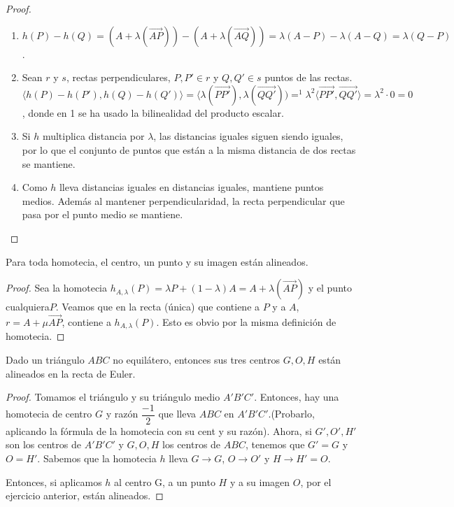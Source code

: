 \begin{proof}\hfill
\begin{enumerate}
	\item $h(P)-h(Q)=(A+\lambda(\vec{AP})) -(A+\lambda(\vec{AQ})) = \lambda(A-P) - \lambda(A-Q) = \lambda (Q-P)$.
	\item  Sean $r$ y $ s$, rectas perpendiculares, $P,P' \in r$ y $Q,Q'\in s$ puntos de las rectas. $\langle h(P) - h(P'),h(Q) - h(Q')\rangle  =  \langle \lambda (\vec{PP'}), \lambda(\vec {QQ'}))=^1 \lambda^2 \langle \vec{PP'},\vec{QQ'}\rangle  = \lambda^2 \cdot 0 = 0 $, donde en 1 se ha usado la bilinealidad del producto escalar.
	\item Si $h$ multiplica distancia por $\lambda$, las distancias iguales siguen siendo iguales, por lo que el conjunto de puntos que están a la misma distancia de dos rectas se mantiene.
	\item Como $h$ lleva distancias iguales en distancias iguales, mantiene puntos medios. Además al mantener perpendicularidad, la recta perpendicular que pasa por el punto medio se mantiene.
\end{enumerate}
\end{proof}


\begin{nprop}

Para toda homotecia, el centro, un punto y su imagen están alineados.
\end{nprop}

\begin{proof}
	Sea la homotecia $h_{A,\lambda}(P) = \lambda P + (1-\lambda)A = A+\lambda(\vec{AP})$ y el punto cualquiera$P$. Veamos que en la recta (única) que contiene a $P$ y a $ A$, $r= A + \mu \vec{AP}$,  contiene a $h_{A,\lambda} (P)$. Esto es obvio por la misma definición de homotecia.
\end{proof}


\begin{nth}
  Dado un triángulo $ABC$ no equilátero, entonces sus tres centros $G,O,H$ están alineados en la recta de Euler.
\end{nth}
\begin{proof}
  Tomamos el triángulo y su triángulo medio $A'B'C'$. Entonces, hay una homotecia de centro $G$ y razón $\dfrac{-1}{2}$ que lleva $ABC$ en $A'B'C'$.(Probarlo, aplicando la fórmula de la homotecia con su cent y su razón).
  Ahora, si $G',O',H'$ son los centros de $A'B'C'$ y $G,O,H$ los centros de $ABC$, tenemos que $G'=G$ y $O=H'$. Sabemos que la homotecia $h$ lleva $G \to G$, $O \to O'$ y $H \to H' = O$.

  Entonces, si aplicamos $h$ al centro G, a un punto $H$ y a su imagen $O$, por el ejercicio anterior, están alineados.

\end{proof}



